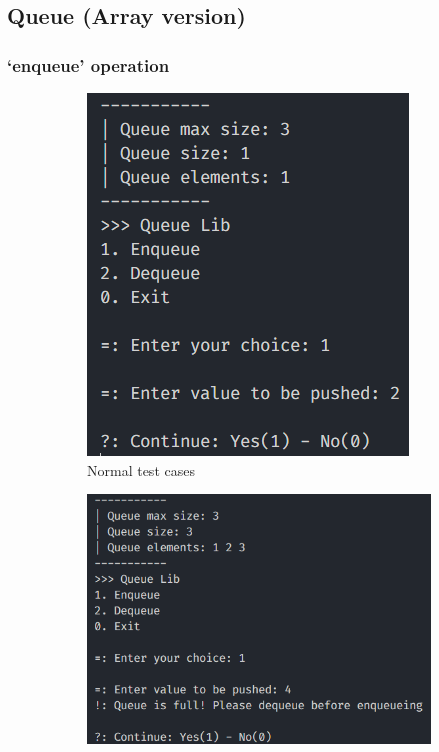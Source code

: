 \thispagestyle{empty}
\pagebreak
\subsection{Queue (Array version)}
\subsubsection*{`enqueue' operation}
\begin{figure}[!ht]
	\centering
	\begin{subfigure}{0.38\textwidth}
		\centering
		\includegraphics[width=\textwidth]{imgs/QueueArray/push/normal.png}
		\caption{Normal test cases}\label{fig:queue_arr_push_normal}
	\end{subfigure}
	\hfill
	\begin{subfigure}{0.59\textwidth}
		\centering
		\includegraphics[width=\textwidth]{imgs/QueueArray/push/full.png}

\end{subfigure}
\end{figure}
